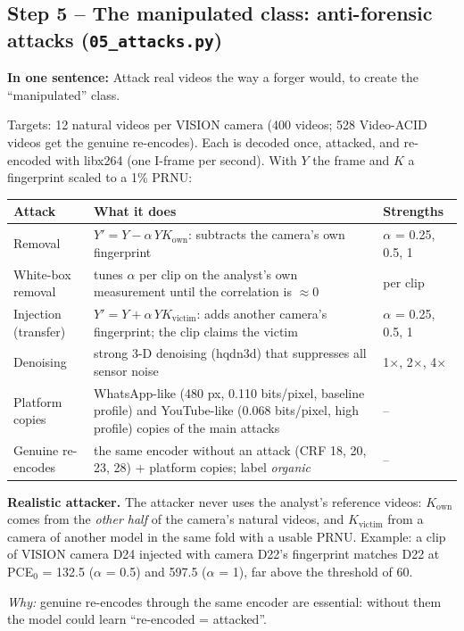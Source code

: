\documentclass[11pt,a4paper]{article}
\newcommand{\say}[1]{\begin{onesentence}\small\textbf{In one sentence:} #1\end{onesentence}}
\newcommand{\why}[1]{\par\noindent\textit{Why:} #1\par}
\begin{document}
\subsection{Step 5 -- The manipulated class: anti-forensic attacks (\texttt{05\_attacks.py})}
\say{Attack real videos the way a forger would, to create the ``manipulated'' class.}
Targets: 12 natural videos per VISION camera (400 videos; 528 Video-ACID videos get the genuine re-encodes). Each is decoded once, attacked,
and re-encoded with libx264 (one I-frame per second). With $Y$ the frame and $K$ a fingerprint scaled to a 1\% PRNU:
\begin{table}[H]\centering\small
\begin{tabularx}{\linewidth}{lYl}\toprule
Attack & What it does & Strengths \\\midrule
Removal & $Y' = Y - \alpha\,Y K_{\text{own}}$: subtracts the camera's own fingerprint & $\alpha$ = 0.25, 0.5, 1 \\
White-box removal & tunes $\alpha$ per clip on the analyst's own measurement until the correlation is $\approx$0 & per clip \\
Injection (transfer) & $Y' = Y + \alpha\,Y K_{\text{victim}}$: adds another camera's fingerprint; the clip claims the victim & $\alpha$ = 0.25, 0.5, 1 \\
Denoising & strong 3-D denoising (hqdn3d) that suppresses all sensor noise & 1$\times$, 2$\times$, 4$\times$ \\
Platform copies & WhatsApp-like (480 px, 0.110 bits/pixel, baseline profile) and YouTube-like (0.068 bits/pixel, high profile)
                  copies of the main attacks & -- \\
Genuine re-encodes & the same encoder without an attack (CRF 18, 20, 23, 28) + platform copies; label \emph{organic} & -- \\\bottomrule
\end{tabularx}\end{table}
\textbf{Realistic attacker.} The attacker never uses the analyst's reference videos: $K_{\text{own}}$ comes from the
\emph{other half} of the camera's natural videos, and $K_{\text{victim}}$ from a camera of another model in the same fold with a
usable PRNU. Example: a clip of VISION camera D24 injected with camera D22's fingerprint matches D22 at PCE$_0$ = 132.5
($\alpha$ = 0.5) and 597.5 ($\alpha$ = 1), far above the threshold of 60.
\why{genuine re-encodes through the same encoder are essential: without them the model could learn ``re-encoded = attacked''.}
\end{document}
